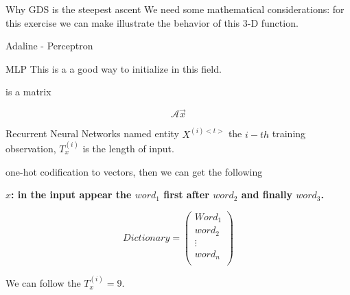 \documentclass{beamer}
\begin{document}
\begin{frame}{Why GDS is the steepest ascent}
We need some mathematical considerations:
for this exercise we can make illustrate the behavior of this 3-D function.
\end{frame}



\begin{frame}{Adaline - Perceptron}

\end{frame}



\begin{frame}{MLP}
This is a a good way to initialize in this field.

is a  matrix 


$$ \mathcal{A}\vec{x}$$
\end{frame}




\begin{frame}{Recurrent Neural Networks}
named entity
$X^{(i)<t>}$ the $i-th$  training observation, $T_{x}^{(i)}$ is the length of input.

one-hot codification to vectors, then we can get the following 

\vspace{1cm}
\textbf{
$x$: in the input appear the $word_{1}$ first after $word_{2}$ and finally $word_{3}$.
}


\[
Dictionary = 
\begin{pmatrix}
Word_{1} \\
word_{2} \\
\vdots \\
word_{n} \\
\end{pmatrix}
\]

We can follow the $T_{x}^{(i)}=9$.

\end{frame}
\end{document}
